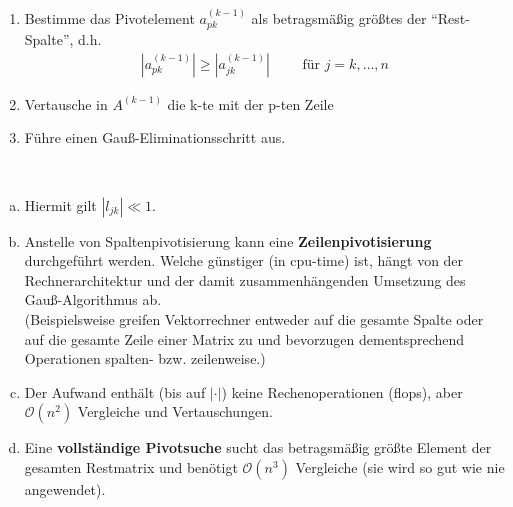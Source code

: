 \begin{enumerate}[1.]
\item Bestimme das Pivotelement $a_{pk}^{(k-1)}$ 
  als betragsmäßig größtes der \enquote{Rest-Spalte}, d.h.
  \begin{gather*}
    |a_{pk}^{(k-1)}|\geq |a_{jk}^{(k-1)}| \qquad  \text{ für } j=k,\dots , n
  \end{gather*}
\item Vertausche in $A^{(k-1)}$ die k-te mit der p-ten Zeile
\item Führe einen Gauß-Eliminationsschritt aus.
\end{enumerate}

\begin{Beme}~
  \begin{enumerate}[a)]
  \item Hiermit gilt $|l_{jk}| \ll 1$.
  \item Anstelle von Spaltenpivotisierung kann eine \textbf{Zeilenpivotisierung}
    durchgeführt werden.
    Welche günstiger (in cpu-time) ist, hängt von der Rechnerarchitektur und
    der damit zusammenhängenden Umsetzung des Gauß-Algorithmus ab.\\
    (Beispielsweise greifen Vektorrechner entweder auf die gesamte Spalte
    oder auf die gesamte Zeile einer Matrix zu und bevorzugen dementsprechend
    Operationen spalten- bzw. zeilenweise.)
  \item Der Aufwand enthält (bis auf $|\cdot |$) keine Rechenoperationen (flops),
    aber $\mathcal{O}(n^2)$ Vergleiche und Vertauschungen.
  \item Eine \textbf{vollständige Pivotsuche} sucht das betragsmäßig größte Element der gesamten Restmatrix und benötigt $\mathcal{O}(n^3) $ Vergleiche
    (sie wird so gut wie nie angewendet).
  \end{enumerate}
\end{Beme}

